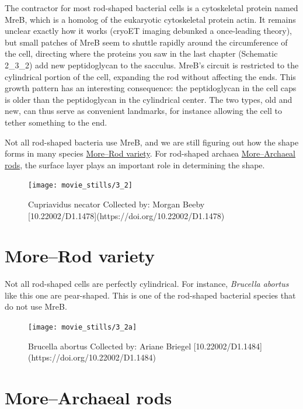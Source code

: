 \documentclass[]{tufte-book}
\begin{document}
The contractor for most rod-shaped bacterial cells is a cytoskeletal
protein named MreB, which is a homolog of the eukaryotic cytoskeletal
protein actin. It remains unclear exactly how it works (cryoET imaging
debunked a once-leading theory), but small patches of MreB seem to
shuttle rapidly around the circumference of the cell, directing where
the proteins you saw in the last chapter (Schematic 2\_3\_2) add new
peptidoglycan to the sacculus. MreB's circuit is restricted to the
cylindrical portion of the cell, expanding the rod without affecting the
ends. This growth pattern has an interesting consequence: the
peptidoglycan in the cell caps is older than the peptidoglycan in the
cylindrical center. The two types, old and new, can thus serve as
convenient landmarks, for instance allowing the cell to tether something
to the end.

Not all rod-shaped bacteria use MreB, and we are still figuring out how
the shape forms in many species
\protect\hyperlink{morerod-variety}{More--Rod variety}. For rod-shaped
archaea \protect\hyperlink{morearchaeal-rods}{More--Archaeal rods}, the
surface layer plays an important role in determining the shape.

\begin{figure}
\texttt{[image: movie\_stills/3\_2]} \caption[Cupriavidus necator Collected by]{Cupriavidus necator Collected by: Morgan Beeby [10.22002/D1.1478](https://doi.org/10.22002/D1.1478)}\label{fig:unnamed-chunk-46}
\end{figure}

\hypertarget{morerod-variety}{\section{More--Rod
variety}\label{morerod-variety}}

Not all rod-shaped cells are perfectly cylindrical. For instance,
\emph{Brucella abortus} like this one are pear-shaped. This is one of
the rod-shaped bacterial species that do not use MreB.

\begin{figure}
\texttt{[image: movie\_stills/3\_2a]} \caption[Brucella abortus Collected by]{Brucella abortus Collected by: Ariane Briegel [10.22002/D1.1484](https://doi.org/10.22002/D1.1484)}\label{fig:unnamed-chunk-47}
\end{figure}

\hypertarget{morearchaeal-rods}{\section{More--Archaeal
rods}\label{morearchaeal-rods}}
\end{document}
